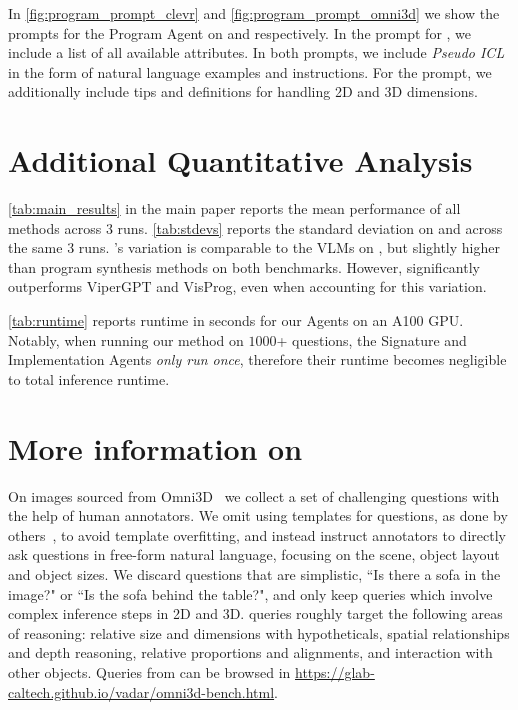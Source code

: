  In \cref{fig:program_prompt_clevr} and \cref{fig:program_prompt_omni3d} we show the prompts for the Program Agent on \clevr and \ourbench respectively. In the prompt for \clevr, we include a list of all available attributes. In both prompts, we include \emph{Pseudo ICL} in the form of natural language examples and instructions. For the \ourbench prompt, we additionally include tips and definitions for handling 2D and 3D dimensions.

\section{Additional Quantitative Analysis}
 \cref{tab:main_results} in the main paper reports the mean performance of all methods across $3$ runs. \cref{tab:stdevs} reports the standard deviation on \clevr and \ourbench across the same $3$ runs. \method's variation is comparable to the VLMs on \ourbench, but slightly higher than program synthesis methods on both benchmarks. However, \method significantly outperforms ViperGPT and VisProg, even when accounting for this variation.

 \cref{tab:runtime} reports runtime in seconds for our Agents on an A100 GPU. Notably, when running our method on $1000$+ questions, the Signature and Implementation Agents \emph{only run once}, therefore their runtime becomes negligible to total inference runtime.

\section{More information on \ourbench}
On images sourced from Omni3D~\cite{omni3d} we collect a set of challenging questions with the help of human annotators. We omit using templates for questions, as done by others~\cite{cambrian1,thinkinginspace,spatial}, to avoid template overfitting, and instead instruct annotators to directly ask questions in free-form natural language, focusing on the scene, object layout and object sizes. 
We discard questions that are simplistic, \eg ``Is there a sofa in the image?" or ``Is the sofa behind the table?", and only keep queries which involve complex inference steps in 2D and 3D.
\ourbench queries roughly target the following areas of reasoning: relative size and dimensions with hypotheticals, spatial relationships and depth reasoning, relative proportions and alignments, and interaction with other objects. Queries from \ourbench can be browsed in \href{https://glab-caltech.github.io/vadar/omni3d-bench.html}{https://glab-caltech.github.io/vadar/omni3d-bench.html}.

